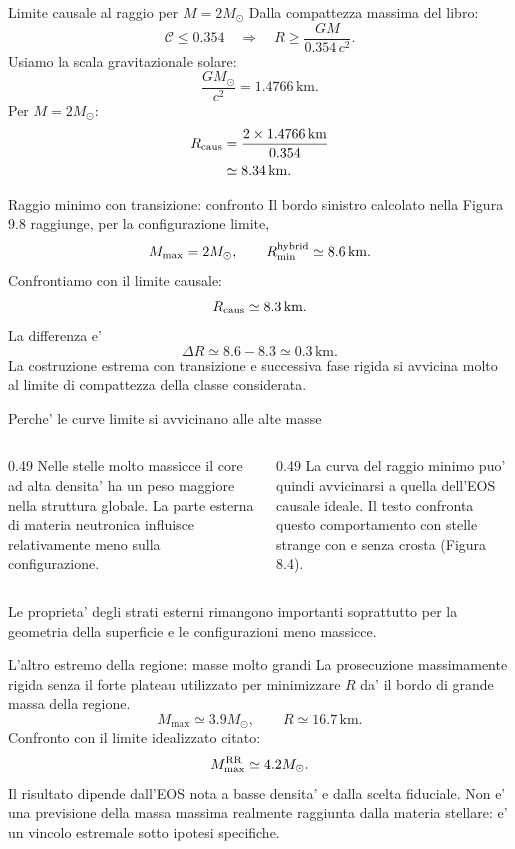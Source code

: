 \begin{frame}{Limite causale al raggio per $M=2M_\odot$}
\small
Dalla compattezza massima del libro:
\[
\mathcal C\leq0.354
\quad\Longrightarrow\quad
R\geq\frac{GM}{0.354\,c^2}.
\]
Usiamo la scala gravitazionale solare:
\[
\frac{GM_\odot}{c^2}=1.4766\,\mathrm{km}.
\]
Per $M=2M_\odot$:
\[
\begin{aligned}
R_{\rm caus}
&=\frac{2\times1.4766\,\mathrm{km}}{0.354}\\
&\simeq8.34\,\mathrm{km}.
\end{aligned}
\]
\end{frame}

\begin{frame}{Raggio minimo con transizione: confronto}
\small
Il bordo sinistro calcolato nella Figura 9.8 raggiunge, per la configurazione limite,
\[
M_{\max}=2M_\odot,\qquad
R_{\min}^{\rm hybrid}\simeq8.6\,\mathrm{km}.
\]
\medskip
Confrontiamo con il limite causale:
\[
R_{\rm caus}\simeq8.3\,\mathrm{km}.
\]
La differenza e'
\[
\Delta R\simeq8.6-8.3\simeq0.3\,\mathrm{km}.
\]
La costruzione estrema con transizione e successiva fase rigida si avvicina molto al limite di compattezza della classe considerata.
\end{frame}

\begin{frame}{Perche' le curve limite si avvicinano alle alte masse}
\small
\begin{columns}[T,onlytextwidth]
\begin{column}{0.49\textwidth}
Nelle stelle molto massicce il core ad alta densita' ha un peso maggiore nella struttura globale.
\medskip
La parte esterna di materia neutronica influisce relativamente meno sulla configurazione.
\end{column}
\begin{column}{0.49\textwidth}
La curva del raggio minimo puo' quindi avvicinarsi a quella dell'EOS causale ideale.
\medskip
Il testo confronta questo comportamento con stelle strange con e senza crosta (Figura 8.4).
\end{column}
\end{columns}
\medskip
Le proprieta' degli strati esterni rimangono importanti soprattutto per la geometria della superficie e le configurazioni meno massicce.
\end{frame}

\begin{frame}{L'altro estremo della regione: masse molto grandi}
\small
La prosecuzione massimamente rigida senza il forte plateau utilizzato per minimizzare $R$ da' il bordo di grande massa della regione.
\[
M_{\max}\simeq3.9M_\odot,
\qquad R\simeq16.7\,\mathrm{km}.
\]
Confronto con il limite idealizzato citato:
\[
M_{\max}^{\rm RR}\simeq4.2M_\odot.
\]
Il risultato dipende dall'EOS nota a basse densita' e dalla scelta fiduciale.
\medskip
Non e' una previsione della massa massima realmente raggiunta dalla materia stellare: e' un vincolo estremale sotto ipotesi specifiche.
\end{frame}

